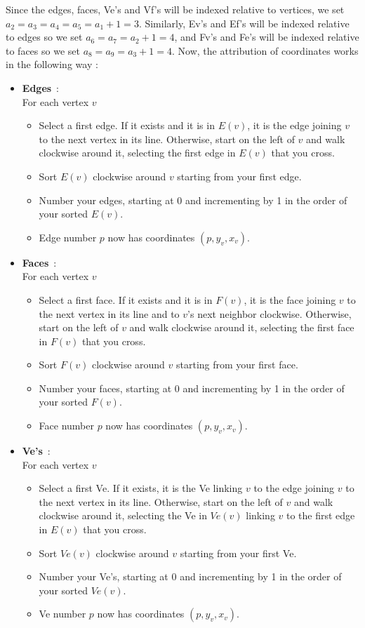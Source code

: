 \documentclass{article}
\begin{document}
Since the edges, faces, Ve's and Vf's will be indexed relative to vertices, we set $a_2 = a_3 = a_4 = a_5 = a_1+1 = 3$. Similarly, Ev's and Ef's will be indexed relative to edges so we set $a_6 = a_7 = a_2+1 = 4$, and Fv's and Fe's will be indexed relative to faces so we set $a_8 = a_9 = a_3+1 = 4$. Now, the attribution of coordinates works in the following way :
\begin{itemize}
	\item \textbf{Edges}~:\\
	For each vertex $v$
	\begin{itemize}[noitemsep, nosep, label=-]
		\item Select a first edge. If it exists and it is in $E(v)$, it is the edge joining $v$ to the next vertex in its line. Otherwise, start on the left of $v$ and walk clockwise around it, selecting the first edge in $E(v)$ that you cross.
		\item Sort $E(v)$ clockwise around $v$ starting from your first edge.
		\item Number your edges, starting at 0 and incrementing by 1 in the order of your sorted $E(v)$.
		\item Edge number $p$ now has coordinates $(p, y_v, x_v)$.
	\end{itemize}
	
	\item \textbf{Faces}~:\\
	For each vertex $v$
	\begin{itemize}[noitemsep, nosep, label=-]
		\item Select a first face. If it exists and it is in $F(v)$, it is the face joining $v$ to the next vertex in its line and to $v$'s next neighbor clockwise. Otherwise, start on the left of $v$ and walk clockwise around it, selecting the first face in $F(v)$ that you cross.
		\item Sort $F(v)$ clockwise around $v$ starting from your first face.
		\item Number your faces, starting at 0 and incrementing by 1 in the order of your sorted $F(v)$.
		\item Face number $p$ now has coordinates $(p, y_v, x_v)$.
	\end{itemize}
	
	\item \textbf{Ve's}~:\\
	For each vertex $v$
	\begin{itemize}[noitemsep, nosep, label=-]
		\item Select a first Ve. If it exists, it is the Ve linking $v$ to the edge joining $v$ to the next vertex in its line. Otherwise, start on the left of $v$ and walk clockwise around it, selecting the Ve in $Ve(v)$ linking $v$ to the first edge in $E(v)$ that you cross.
		\item Sort $Ve(v)$ clockwise around $v$ starting from your first Ve.
		\item Number your Ve's, starting at 0 and incrementing by 1 in the order of your sorted $Ve(v)$.
		\item Ve number $p$ now has coordinates $(p, y_v, x_v)$.
	\end{itemize}
	

\end{itemize}
\end{document}
